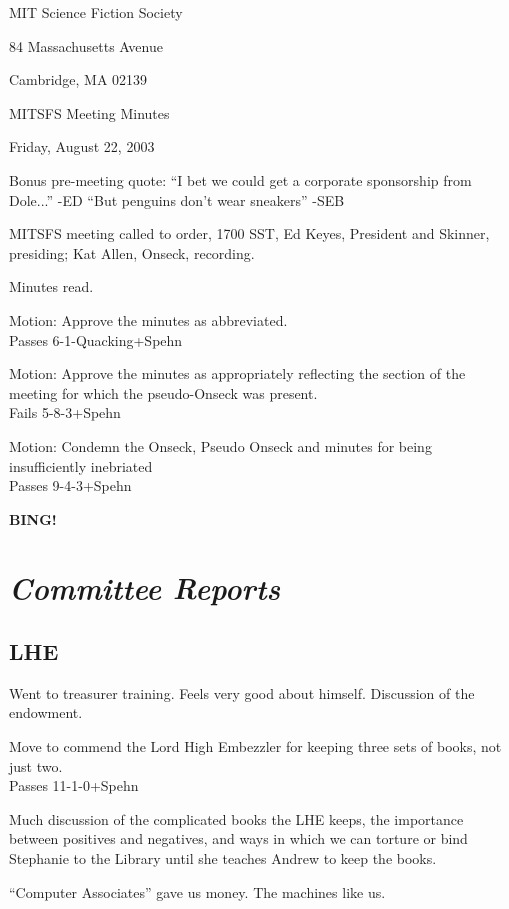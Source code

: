 \documentclass[10pt]{article}
\newcommand{\bing}{{\bf BING!} }
\newcommand{\goto}[1]{\bing \vskip 12pt \section*{{\em{#1}}}}
\begin{document}
\begin{center}

MIT Science Fiction Society 

84 Massachusetts Avenue

Cambridge, MA 02139

\vspace{12pt}

MITSFS Meeting Minutes 

Friday, August 22, 2003

\end{center}
 
\vspace{18pt}

\setlength{\parskip}{6pt}

\noindent
Bonus pre-meeting quote: ``I bet we could get a corporate sponsorship
from Dole...'' -ED
``But penguins don't wear sneakers'' -SEB

MITSFS meeting called to order, 1700 SST, Ed Keyes, President and
Skinner, presiding; Kat Allen,  Onseck, recording.

Minutes read.

Motion: Approve the minutes as abbreviated.\\
Passes 6-1-Quacking+Spehn

Motion: Approve the minutes as appropriately reflecting the section of
the meeting for which the pseudo-Onseck was present.\\
Fails 5-8-3+Spehn

Motion: Condemn the Onseck, Pseudo Onseck and minutes for being insufficiently inebriated\\
Passes 9-4-3+Spehn

\goto{Committee Reports}
\subsection*{LHE }
Went to treasurer training. Feels very good about himself.
Discussion of the endowment.

Move to commend the Lord High Embezzler for keeping three sets of
books, not just two.\\
Passes 11-1-0+Spehn

Much discussion of the complicated books the LHE keeps, the
importance between positives and negatives, and ways in which we can
torture or bind Stephanie to the Library until she teaches Andrew to
keep the books.

``Computer Associates'' gave us money. The machines like us.
\end{document}
